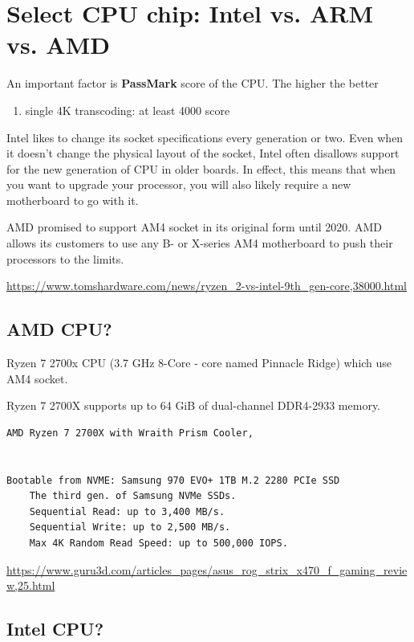 \section{Select CPU chip: Intel vs. ARM vs. AMD}
\label{sec:CPU-choice}


An important factor is {\bf PassMark} score of the CPU. The higher the better
\begin{enumerate}
  \item single 4K transcoding: at least 4000 score
\end{enumerate}


Intel likes to change its socket specifications every generation or two. Even
when it doesn’t change the physical layout of the socket, Intel often disallows
support for the new generation of CPU in older boards. In effect, this means
that when you want to upgrade your processor, you will also likely require a new
motherboard to go with it.

AMD promised to support AM4 socket in its original form until 2020.
AMD allows its customers to use any B- or X-series AM4 motherboard to push their
processors to the limits.

\url{https://www.tomshardware.com/news/ryzen_2-vs-intel-9th_gen-core,38000.html}


\subsection{AMD CPU?}

Ryzen 7 2700x CPU (3.7 GHz 8-Core - core named Pinnacle Ridge) which use AM4 socket.

Ryzen 7 2700X supports up to 64 GiB of dual-channel DDR4-2933 memory.


\begin{verbatim}
AMD Ryzen 7 2700X with Wraith Prism Cooler, 


Bootable from NVME: Samsung 970 EVO+ 1TB M.2 2280 PCIe SSD
	The third gen. of Samsung NVMe SSDs.
	Sequential Read: up to 3,400 MB/s. 
	Sequential Write: up to 2,500 MB/s. 
	Max 4K Random Read Speed: up to 500,000 IOPS.
\end{verbatim}

\url{https://www.guru3d.com/articles_pages/asus_rog_strix_x470_f_gaming_review,25.html}


\subsection{Intel CPU?}


